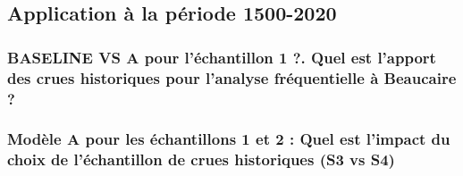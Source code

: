 \documentclass[11pt]{article}
\begin{document}
	\subsection{Application à la période 1500-2020}

	
		\subsubsection{BASELINE VS A pour l'échantillon 1 ?. Quel est l'apport des crues historiques pour l'analyse fréquentielle à Beaucaire ?}
	
		\subsubsection{Modèle A pour les échantillons 1 et 2 : Quel est l'impact du choix de l'échantillon de crues historiques (S3 vs S4)}
	
	
	

	
\end{document}
